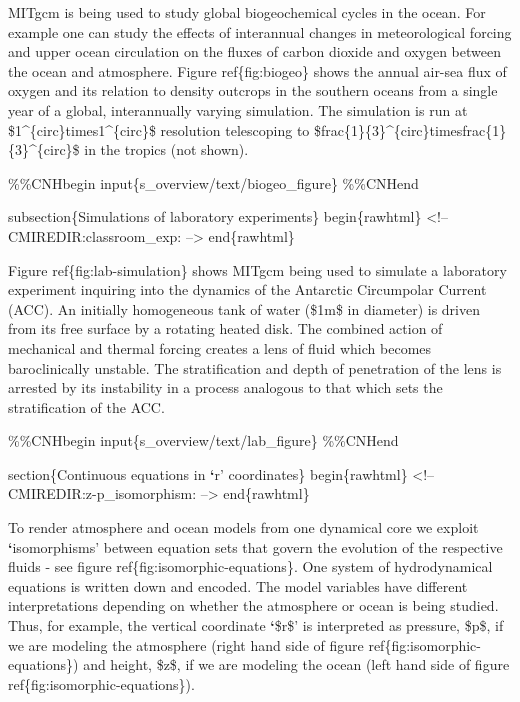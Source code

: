\documentclass[letterpaper,10pt,english]{sphinxmanual}
\begin{document}
MITgcm is being used to study global biogeochemical cycles in the
ocean. For example one can study the effects of interannual changes in
meteorological forcing and upper ocean circulation on the fluxes of
carbon dioxide and oxygen between the ocean and atmosphere. Figure
ref\{fig:biogeo\} shows the annual air-sea flux of oxygen and its
relation to density outcrops in the southern oceans from a single year
of a global, interannually varying simulation. The simulation is run
at \$1\textasciicircum{}\{circ\}times1\textasciicircum{}\{circ\}\$ resolution telescoping to
\$frac\{1\}\{3\}\textasciicircum{}\{circ\}timesfrac\{1\}\{3\}\textasciicircum{}\{circ\}\$ in the tropics (not
shown).

\%\%CNHbegin
input\{s\_overview/text/biogeo\_figure\}
\%\%CNHend

subsection\{Simulations of laboratory experiments\}
begin\{rawhtml\}
\textless{}!-- CMIREDIR:classroom\_exp: --\textgreater{}
end\{rawhtml\}

Figure ref\{fig:lab-simulation\} shows MITgcm being used to simulate a
laboratory experiment inquiring into the dynamics of the Antarctic Circumpolar Current (ACC). An
initially homogeneous tank of water (\$1m\$ in diameter) is driven from its
free surface by a rotating heated disk. The combined action of mechanical
and thermal forcing creates a lens of fluid which becomes baroclinically
unstable. The stratification and depth of penetration of the lens is
arrested by its instability in a process analogous to that which sets the
stratification of the ACC.

\%\%CNHbegin
input\{s\_overview/text/lab\_figure\}
\%\%CNHend

section\{Continuous equations in {\color{red}\bfseries{}{}`}r' coordinates\}
begin\{rawhtml\}
\textless{}!-- CMIREDIR:z-p\_isomorphism: --\textgreater{}
end\{rawhtml\}

To render atmosphere and ocean models from one dynamical core we exploit
{\color{red}\bfseries{}{}`}isomorphisms' between equation sets that govern the evolution of the
respective fluids - see figure ref\{fig:isomorphic-equations\}.
One system of hydrodynamical equations is written down
and encoded. The model variables have different interpretations depending on
whether the atmosphere or ocean is being studied. Thus, for example, the
vertical coordinate {\color{red}\bfseries{}{}`}\$r\$' is interpreted as pressure, \$p\$, if we are
modeling the atmosphere (right hand side of figure ref\{fig:isomorphic-equations\})
and height, \$z\$, if we are modeling the ocean (left hand side of figure
ref\{fig:isomorphic-equations\}).
\end{document}
